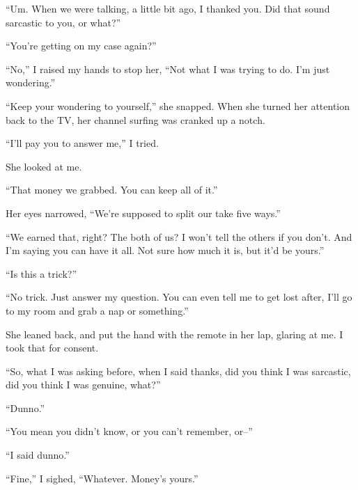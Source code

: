 ``Um.  When we were talking, a little bit ago, I thanked you.  Did that sound sarcastic to you, or what?''



``You're getting on my case again?''



``No,'' I raised my hands to stop her, ``Not what I was trying to do.  I'm just wondering.''



``Keep your wondering to yourself,'' she snapped.  When she turned her attention back to the TV, her channel surfing was cranked up a notch.



``I'll pay you to answer me,'' I tried.



She looked at me.



``That money we grabbed.  You can keep all of it.''



Her eyes narrowed, ``We're supposed to split our take five ways.''



``We earned that, right?  The both of us?  I won't tell the others if you don't. And I'm saying you can have it all.  Not sure how much it is, but it'd be yours.''



``Is this a trick?''



``No trick.  Just answer my question.  You can even tell me to get lost after, I'll go to my room and grab a nap or something.''



She leaned back, and put the hand with the remote in her lap, glaring at me.  I took that for consent.



``So, what I was asking before, when I said thanks, did you think I was sarcastic, did you think I was genuine, what?''



``Dunno.''



``You mean you didn't know, or you can't remember, or--''



``I said dunno.''



``Fine,'' I sighed, ``Whatever.  Money's yours.''



